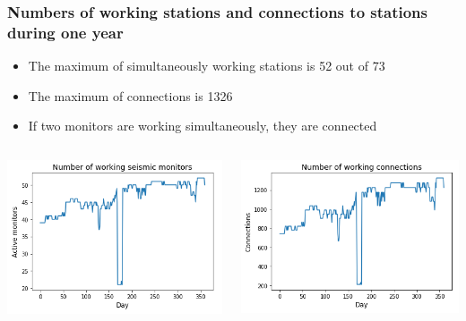 \documentclass{beamer}
\begin{document}
\begin{frame}
\frametitle{Numbers of working stations and connections to stations during one year}
\begin{itemize}
\item The maximum of simultaneously working stations is 52 out of 73
\item The maximum of connections is 1326
\item If two monitors are working simultaneously, they are connected
\end{itemize}

\begin{columns}
\includegraphics[width=\textwidth]{working_monitors-presentation.png}

\includegraphics[width=\textwidth]{working_connections_presentation.png}
\end{columns}
\end{frame}
\end{document}
